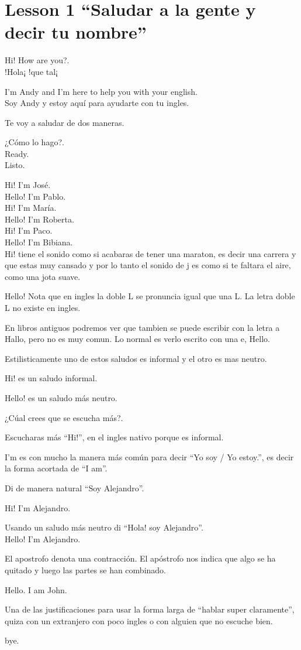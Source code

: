 \section{Lesson 1 ``Saludar a la gente y decir tu nombre''}

Hi! How are you?.\\
!Hola¡ !que tal¡

I'm Andy and I'm here to help you with your english.\\
Soy Andy y estoy aquí para ayudarte con tu ingles.

Te voy a saludar de dos maneras.

¿Cómo lo hago?.\\
Ready.\\
Listo.

Hi! I'm José.\\
Hello! I'm Pablo.\\
Hi! I'm María.\\
Hello! I'm Roberta.\\
Hi! I'm Paco.\\
Hello! I'm Bibiana.\\

Hi! tiene el sonido como si acabaras de tener una maraton, es decir una
carrera y que estas muy cansado y por lo tanto el sonido de j es como
si te faltara el aire, como una jota suave.

Hello! Nota que en ingles la doble L se pronuncia igual que una L. La letra
doble L no existe en ingles.

En libros antiguos podremos ver que tambien se puede escribir con la letra a
Hallo, pero no es muy comun. Lo normal es verlo escrito con una e, Hello.

Estilisticamente uno de estos saludos es informal y el otro es mas neutro.

Hi! es un saludo informal.

Hello! es un saludo más neutro.

¿Cúal crees que se escucha más?.

Escucharas más ``Hi!'', en el ingles nativo porque es informal.

I'm es con mucho la manera más común para decir ``Yo soy / Yo estoy.'',
es decir la forma acortada de ``I am''.

Di de manera natural ``Soy Alejandro''.

Hi! I'm Alejandro.

Usando un saludo más neutro di ``Hola! soy Alejandro''.\\
Hello! I'm Alejandro.

El apostrofo denota una contracción. El apóstrofo nos indica que algo se
ha quitado y luego las partes se han combinado.

Hello. I am John.

Una de las justificaciones para usar la forma larga de ``hablar super
claramente'', quiza con un extranjero con poco ingles o con alguien que
no escuche bien.

bye.
